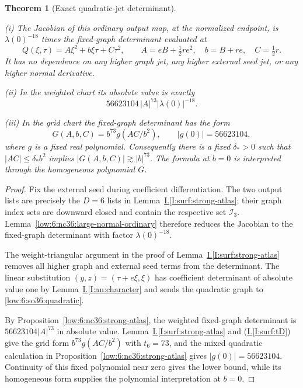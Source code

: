 \documentclass[11pt]{amsart}
\newtheorem{theorem}{Theorem}[section]
\theoremstyle{definition}
\theoremstyle{remark}
\numberwithin{equation}{section}
\newcommand{\partIref}[1]{\hyperref[I:#1]{I.\ref*{I:#1}}}
\newcommand{\partIeqref}[1]{\textup{(\partIref{#1})}}
\begin{document}
\begin{theorem}[Exact quadratic-jet determinant]\label{low:6:so36:exact-atlas}

\noindent\textup{(i)} The Jacobian of this ordinary output map, at the normalized endpoint, is $\lambda(0)^{-18}$ times the fixed-graph determinant evaluated at
\begin{equation}\label{low:6:so36:quadratic}
Q(\xi,\tau)=A\xi^2+b\xi\tau+C\tau^2,\qquad A=eB+\tfrac12re^2,\quad b=B+re,\quad C=\tfrac12r.
\end{equation}
It has no dependence on any higher graph jet, any higher external seed jet, or any higher normal derivative.

\noindent\textup{(ii)} In the weighted chart its absolute value is exactly
\[
56623104\,|A|^{73}|\lambda(0)|^{-18}.
\]

\noindent\textup{(iii)} In the grid chart the fixed-graph determinant has the form
\[
G(A,b,C)=b^{73}g(AC/b^2),\qquad |g(0)|=56623104,
\]
where $g$ is a fixed real polynomial. Consequently there is a fixed $\delta_*>0$ such that $|AC|\le\delta_*b^2$ implies $|G(A,b,C)|\gtrsim|b|^{73}$. The formula at $b=0$ is interpreted through the homogeneous polynomial $G$.
\end{theorem}
\begin{proof}
Fix the external seed during coefficient differentiation. The two output lists are precisely the $D=6$ lists in Lemma~\partIref{surf:strong-atlas}; their graph index sets are downward closed and contain the respective set $\mathcal I_3$. Lemma~\ref{low:6:nc36:large-normal-ordinary} therefore reduces the Jacobian to the fixed-graph determinant with factor $\lambda(0)^{-18}$.

The weight-triangular argument in the proof of Lemma~\partIref{surf:strong-atlas} removes all higher graph and external seed terms from the determinant. The linear substitution $(y,z)=(\tau+e\xi,\xi)$ has coefficient determinant of absolute value one by Lemma~\partIref{an:character} and sends the quadratic graph to \eqref{low:6:so36:quadratic}.

By Proposition~\ref{low:6:nc36:strong-atlas}, the weighted fixed-graph determinant is $56623104|A|^{73}$ in absolute value. Lemma~\partIref{surf:strong-atlas} and \partIeqref{surf:tD} give the grid form $b^{73}g(AC/b^2)$ with $t_6=73$, and the mixed quadratic calculation in Proposition~\ref{low:6:nc36:strong-atlas} gives $|g(0)|=56623104$. Continuity of this fixed polynomial near zero gives the lower bound, while its homogeneous form supplies the polynomial interpretation at $b=0$.
\end{proof}
\end{document}
